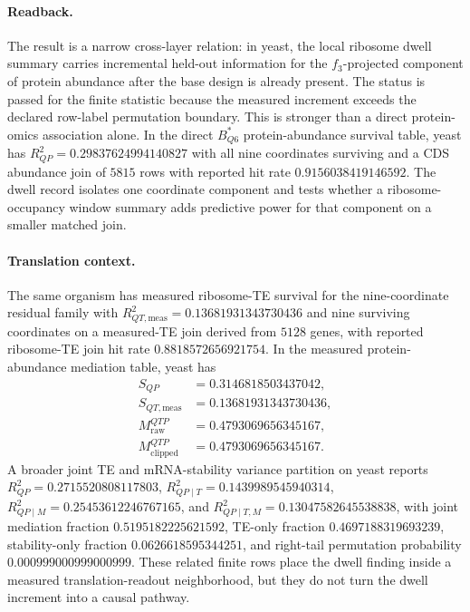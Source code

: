 \paragraph{Readback.}
The result is a narrow cross-layer relation: in yeast, the local ribosome dwell summary carries incremental held-out information for the $f_3$-projected component of protein abundance after the base design is already present.  The status is passed for the finite statistic because the measured increment exceeds the declared row-label permutation boundary.  This is stronger than a direct protein-omics association alone.  In the direct $B^*_{Q6}$ protein-abundance survival table, yeast has $R^2_{QP}=0.29837624994140827$ with all nine coordinates surviving and a CDS abundance join of $5815$ rows with reported hit rate $0.9156038419146592$.  The dwell record isolates one coordinate component and tests whether a ribosome-occupancy window summary adds predictive power for that component on a smaller matched join.

\paragraph{Translation context.}
The same organism has measured ribosome-TE survival for the nine-coordinate residual family with $R^2_{QT,\mathrm{meas}}=0.13681931343730436$ and nine surviving coordinates on a measured-TE join derived from $5128$ genes, with reported ribosome-TE join hit rate $0.8818572656921754$.  In the measured protein-abundance mediation table, yeast has
$$
\begin{aligned}
S_{QP} &= 0.3146818503437042,\\
S_{QT,\mathrm{meas}} &= 0.13681931343730436,\\
M^{QTP}_{\mathrm{raw}} &= 0.4793069656345167,\\
M^{QTP}_{\mathrm{clipped}} &= 0.4793069656345167.
\end{aligned}
$$
A broader joint TE and mRNA-stability variance partition on yeast reports $R^2_{QP}=0.2715520808117803$, $R^2_{QP\mid T}=0.1439989545940314$, $R^2_{QP\mid M}=0.25453612246767165$, and $R^2_{QP\mid T,M}=0.13047582645538838$, with joint mediation fraction $0.5195182225621592$, TE-only fraction $0.4697188319693239$, stability-only fraction $0.0626618595344251$, and right-tail permutation probability $0.000999000999000999$.  These related finite rows place the dwell finding inside a measured translation-readout neighborhood, but they do not turn the dwell increment into a causal pathway.

